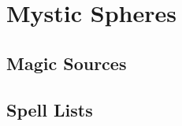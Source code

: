 \chapter{Mystic Spheres}\label{Mystic Spheres}

\section{Magic Sources}\label{Magic Sources}

  

  \newpage
\section{Spell Lists}\label{Spell Lists}

  

  
